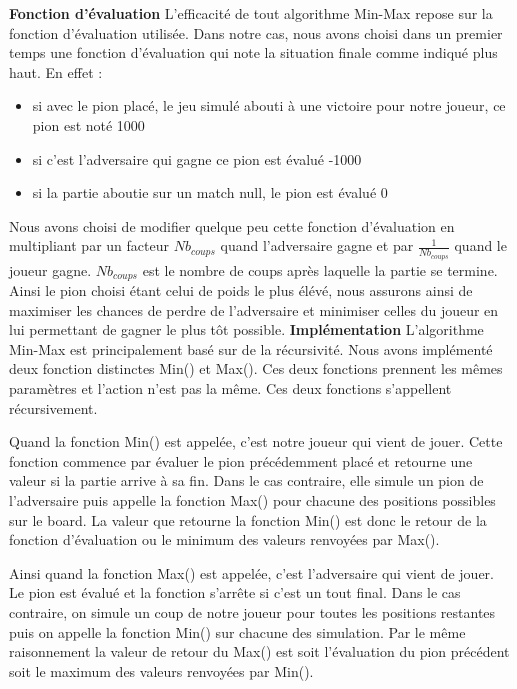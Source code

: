 \documentclass[12pt]{article}
\begin{document}
\textbf{Fonction d'évaluation}
L'efficacité de tout algorithme Min-Max repose sur la fonction d'évaluation utilisée. Dans notre cas, nous avons choisi dans un premier temps une fonction d'évaluation qui note la situation finale comme indiqué plus haut. En effet :
\begin{itemize}
    \item si avec le pion placé, le jeu simulé abouti à une victoire pour notre joueur, ce pion est noté 1000
    \item si c'est l'adversaire qui gagne ce pion est évalué -1000
    \item si la partie aboutie sur un match null, le pion est évalué 0
\end{itemize}
Nous avons choisi de modifier quelque peu cette fonction d'évaluation en multipliant par un facteur $Nb_{coups}$ quand l'adversaire gagne et par $\frac{1}{Nb_{coups}}$ quand le joueur gagne. $Nb_{coups}$ est le nombre de coups après laquelle la partie se termine. Ainsi le pion choisi étant celui de poids le plus élévé, nous assurons ainsi de maximiser les chances de perdre de l'adversaire et minimiser celles du joueur en lui permettant de gagner le plus tôt possible.
\newline
\textbf{Implémentation}\newline
\newline
L'algorithme Min-Max est principalement basé sur de la récursivité. Nous avons implémenté deux fonction distinctes Min() et Max(). Ces deux fonctions prennent les mêmes paramètres et l'action n'est pas la même. Ces deux fonctions s'appellent récursivement.

Quand la fonction Min() est appelée, c'est notre joueur qui vient de jouer. Cette fonction commence par évaluer le pion précédemment placé et retourne une valeur si la partie arrive à sa fin. Dans le cas contraire, elle simule un pion de l'adversaire puis appelle la fonction Max() pour chacune des positions possibles sur le board. La valeur que retourne la fonction Min() est donc le retour de la fonction d'évaluation ou le minimum des valeurs renvoyées par Max().

Ainsi quand la fonction Max() est appelée, c'est l'adversaire qui vient de jouer. Le pion est évalué et la fonction s'arrête si c'est un tout final. Dans le cas contraire, on simule un coup de notre joueur pour toutes les positions restantes puis on appelle la fonction Min() sur chacune des simulation. Par le même raisonnement la valeur de retour du Max() est soit l'évaluation du pion précédent soit le maximum des valeurs renvoyées par Min().
\end{document}

